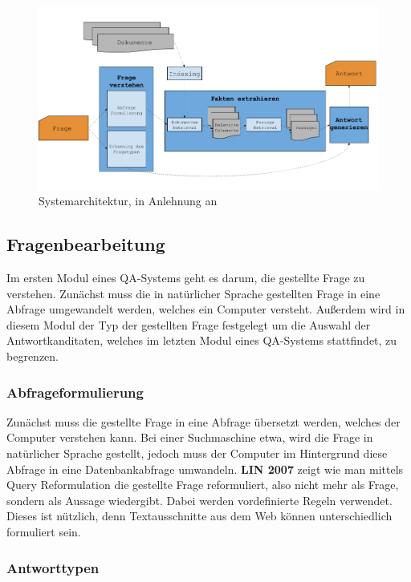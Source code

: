 \documentclass[
        ngerman,
        paper=a4,
        numbers=noendperiod,
]{scrreprt}
\begin{document}
\begin{figure}[H]
    \centering\includegraphics[width=1.0\linewidth]{images/image1.png}
    \caption[Systemarchitektur]{Systemarchitektur, in Anlehnung an \cite []{eff70}}
    \label{fig:diagram1}
\end{figure}





\subsection{Fragenbearbeitung}

Im ersten Modul eines QA-Systems geht es darum, die gestellte Frage zu verstehen. Zunächst muss die in natürlicher Sprache gestellten Frage in eine Abfrage umgewandelt werden, welches ein Computer versteht. Außerdem wird in diesem Modul der Typ der gestellten Frage festgelegt um die Auswahl der Antwortkanditaten, welches im letzten Modul eines QA-Systems stattfindet, zu begrenzen.

\subsubsection{Abfrageformulierung}
Zunächst muss die gestellte Frage in eine Abfrage übersetzt werden, welches der Computer verstehen kann. Bei einer Suchmaschine etwa, wird die Frage in natürlicher Sprache gestellt, jedoch muss der Computer im Hintergrund diese Abfrage in eine Datenbankabfrage umwandeln. 
\textbf{LIN 2007} zeigt wie man mittels  \glqq Query Reformulation\grqq{} die gestellte Frage reformuliert, also nicht mehr als Frage, sondern als Aussage wiedergibt. Dabei werden vordefinierte Regeln verwendet. Dieses ist nützlich, denn Textausschnitte aus dem Web können unterschiedlich formuliert sein.

\subsubsection{Antworttypen}
\end{document}
